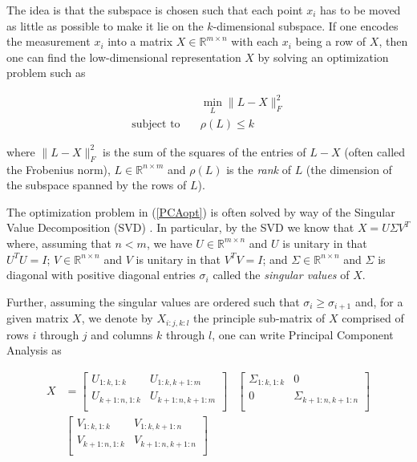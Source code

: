 \documentclass[conference]{IEEEtran}
\begin{document}
The idea is that the subspace is chosen such that each point $x_i$ has to be moved as little as possible
to make it lie on the $k$-dimensional subspace.  If one encodes the measurement $x_i$ into a matrix
$X \in \mathbb{R}^{m \times n}$ with each $x_i$ being a row of $X$, then one can find
the low-dimensional representation $X$ by solving an optimization problem such as 

\begin{align} \label{PCAopt}
  &\min_{L} \| L-X \|_F^2 \\ \nonumber
  \text{subject to}\quad & \rho(L) \le k
\end{align}

\noindent where $\| L-X \|_F^2$ is the sum of the squares of the entries of $L-X$ (often called the Frobenius norm), $L \in \mathbb{R}^{n \times m}$ and $\rho(L)$ is the \emph{rank} of $L$ (the dimension of the subspace spanned by the rows of $L$).

The optimization problem in (\ref{PCAopt}) is often solved by way of the Singular Value
Decomposition (SVD) \cite{Eckart1936}.  In particular, by the SVD we know that $X=U \Sigma V^T$ where, assuming that $n<m$, we have $U \in \mathbb{R}^{m \times n}$ and $U$ is unitary in that $U^T U = I$; $V \in \mathbb{R}^{n \times n}$ and $V$ is unitary in that $V^T V = I$; and $\Sigma \in \mathbb{R}^{n \times n}$ and $\Sigma$ is diagonal with positive diagonal entries $\sigma_i$ called the \emph{singular values} of $X$.

Further, assuming the singular values are ordered such that $\sigma_i \ge \sigma_{i+1}$
and, for a given matrix $X$, we denote by $X_{i:j,k:l}$ the principle sub-matrix of $X$ comprised of rows $i$ through $j$ and columns $k$ through $l$, one can write Principal Component Analysis as 

\begin{align*}
X 
& = 
\begin{bmatrix}
U_{1:k,1:k} & U_{1:k,k+1:m} \\
U_{k+1:n,1:k} & U_{k+1:n,k+1:m} \\
\end{bmatrix}
&
\begin{bmatrix}
\Sigma_{1:k,1:k} & 0 \\
0 & \Sigma_{k+1:n,k+1:n} \\
\end{bmatrix} \\
&
\begin{bmatrix}
V_{1:k,1:k} & V_{1:k,k+1:n} \\
V_{k+1:n,1:k} & V_{k+1:n,k+1:n} \\
\end{bmatrix} \\
\end{align*}
\end{document}
